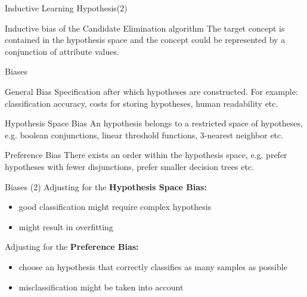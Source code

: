 \documentclass{beamer}
\begin{document}
\begin{frame}{Inductive Learning Hypothesis(2)}
\begin{block}{Inductive bias of the Candidate Elimination algorithm}
The target concept is contained in the hypothesis space and the concept could be represented by a conjunction of attribute values.
\end{block}
\end{frame}

\begin{frame}{Biases}

\begin{block}{General Bias}
Specification after which hypotheses are constructed. For example: classification accuracy, costs for storing hypotheses, human readability etc.
\end{block}

\begin{block}{Hypothesis Space Bias}
An hypothesis belongs to a restricted space of hypotheses, e.g. boolean conjunctions, linear threshold functions, 3-nearest neighbor etc.
\end{block}

\begin{block}{Preference Bias}
There exists an order within the hypothesis space, e.g. prefer hypotheses with fewer disjunctions, prefer smaller decision trees etc.
\end{block}
\end{frame}


\begin{frame}{Biases (2)}
Adjusting for the \textbf{Hypothesis Space Bias:}
\begin{itemize}
\item good classification might require complex hypothesis
\item might result in overfitting
\end{itemize}

Adjusting for the \textbf{Preference Bias:}
\begin{itemize}
\item choose an hypothesis that correctly classifies as many samples as possible
\item misclassification might be taken into account
\end{itemize}
\end{frame}




\newpage


\end{document}
